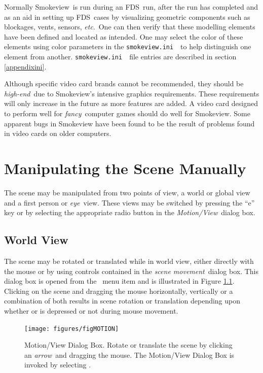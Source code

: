 \documentclass[11pt,twoside]{book}
\newcommand{\svini}{{\tt smokeview.ini}\ }
\newcommand{\figoptions}{hbp}
\newcommand{\fds}{{FDS}}
\newcommand{\smokeview}{{Smokeview}}
\newcommand{\etc}{{\em etc}}
\newcommand{\frameit}[1]{\fbox{\tt #1}}
\begin{document}
Normally \smokeview\ is run during an \fds\ run, after the
run has completed and as an aid in setting up \fds\ cases
by visualizing geometric components such as blockages,
vents, sensors, \etc.\ One can then verify that these
modelling elements have been defined and located as
intended. One may select the color of these elements using
color parameters in the \svini\ to help
distinguish one element from another. \svini\ file
entries are described in section \ref{appendixini}.

Although specific video card brands cannot be recommended, they
should be {\em high-end}\ due to Smokeview's intensive graphics
requirements. These requirements will only increase in the future
as more features are added.  A video card designed to perform well
for {\em fancy}\ computer games should do well for Smokeview. Some
apparent bugs in Smokeview have been found to be the result of
problems found in video cards on older computers.


\chapter{Manipulating the Scene Manually}
The scene may be manipulated from two points of view, a world or
global view and a first person or {\em eye}\ view.  These views may
be switched by pressing the ``e'' key or by selecting the
appropriate radio button in the {\em Motion/View}\ dialog box.

\section{World View}

The scene may be rotated or translated while in world view, either
directly with the mouse or by using controls contained in the
{\em scene movement}\ dialog box. This dialog box is opened from the
\ menu item and is illustrated in
Figure \ref{figMOTION}. Clicking on the scene and dragging the
mouse horizontally, vertically or a combination of both results in
scene rotation or translation depending upon whether
\frameit{CTRL} or \frameit{ALT} is depressed or not during mouse
movement.

\begin{figure}[\figoptions]
\centerline{
\texttt{[image: figures/figMOTION]}
}
\caption[Motion/View Dialog Box.]{Motion/View Dialog Box. Rotate or translate
the scene by clicking an {\em arrow}\ and dragging the mouse. The
Motion/View Dialog Box is invoked by selecting
\frameit{Dialogs$>$Motion/View}. }
\label{figMOTION}
\end{figure}
\end{document}
